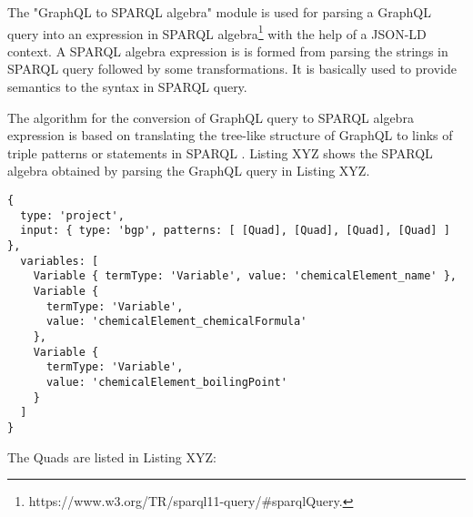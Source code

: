The "GraphQL to SPARQL algebra" module is used for parsing a GraphQL query into an expression in SPARQL algebra\footnote{https://www.w3.org/TR/sparql11-query/\#sparqlQuery.} with the help of a JSON-LD context. A SPARQL algebra expression is is formed from parsing the strings in SPARQL query followed by some transformations. It is basically used to provide semantics to the syntax in SPARQL query.

The algorithm for the conversion of GraphQL query to SPARQL algebra expression is based on translating the tree-like structure of GraphQL to links of triple patterns or statements  in SPARQL \cite{Taelman2018}. Listing XYZ shows the SPARQL algebra obtained by parsing the GraphQL query in Listing XYZ.

\begin{minipage}{\linewidth}
\begin{lstlisting}[label=listing:listing8, caption={Generated SPARQL Algebra}]
{
  type: 'project',
  input: { type: 'bgp', patterns: [ [Quad], [Quad], [Quad], [Quad] ] },
  variables: [
    Variable { termType: 'Variable', value: 'chemicalElement_name' },
    Variable {
      termType: 'Variable',
      value: 'chemicalElement_chemicalFormula'
    },
    Variable {
      termType: 'Variable',
      value: 'chemicalElement_boilingPoint'
    }
  ]
}

\end{lstlisting}
\end{minipage}

The Quads are listed in Listing XYZ:

